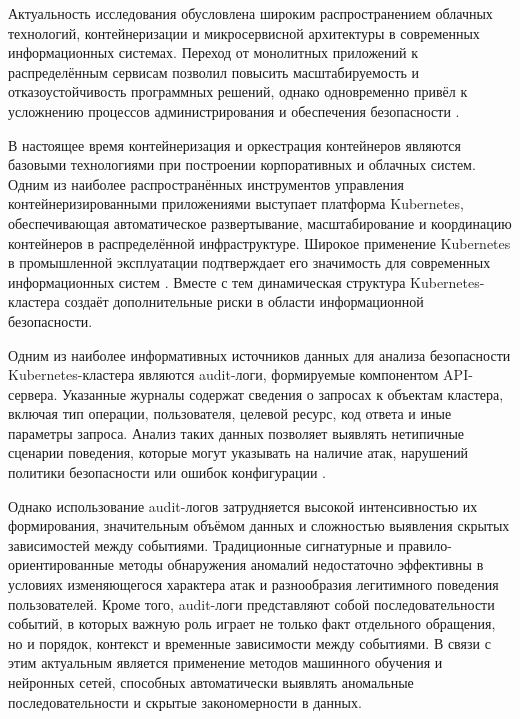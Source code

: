 \introduction

Актуальность исследования обусловлена широким распространением облачных технологий, контейнеризации и микросервисной архитектуры в современных информационных системах. Переход от монолитных приложений к распределённым сервисам позволил повысить масштабируемость и отказоустойчивость программных решений, однако одновременно привёл к усложнению процессов администрирования и обеспечения безопасности \cite{Dragoni_2017_Microservices_yesterday_today_and_tomorrow}.

В настоящее время контейнеризация и оркестрация контейнеров являются базовыми технологиями при построении корпоративных и облачных систем. Одним из наиболее распространённых инструментов управления контейнеризированными приложениями выступает платформа Kubernetes, обеспечивающая автоматическое развертывание, масштабирование и координацию контейнеров в распределённой инфраструктуре. Широкое применение Kubernetes в промышленной эксплуатации подтверждает его значимость для современных информационных систем \cite{Container_Security_Extensive_Roadmap}. Вместе с тем динамическая структура Kubernetes-кластера создаёт дополнительные риски в области информационной безопасности.

Одним из наиболее информативных источников данных для анализа безопасности Kubernetes-кластера являются audit-логи, формируемые компонентом API-сервера. Указанные журналы содержат сведения о запросах к объектам кластера, включая тип операции, пользователя, целевой ресурс, код ответа и иные параметры запроса. Анализ таких данных позволяет выявлять нетипичные сценарии поведения, которые могут указывать на наличие атак, нарушений политики безопасности или ошибок конфигурации \cite{KubernetesAudit}.

Однако использование audit-логов затрудняется высокой интенсивностью их формирования, значительным объёмом данных и сложностью выявления скрытых зависимостей между событиями. Традиционные сигнатурные и правило-ориентированные методы обнаружения аномалий недостаточно эффективны в условиях изменяющегося характера атак и разнообразия легитимного поведения пользователей. Кроме того, audit-логи представляют собой последовательности событий, в которых важную роль играет не только факт отдельного обращения, но и порядок, контекст и временные зависимости между событиями. В связи с этим актуальным является применение методов машинного обучения и нейронных сетей, способных автоматически выявлять аномальные последовательности и скрытые закономерности в данных.

